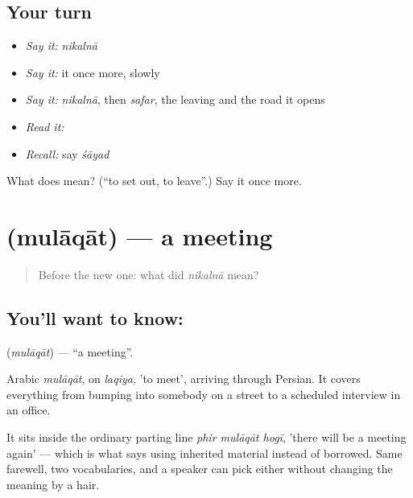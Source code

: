 \subsection*{Your turn}
\begin{itemize}
\raggedright
  \item \emph{Say it:} \emph{nikalnā}
  \item \emph{Say it:} it once more, slowly
  \item \emph{Say it:} \emph{nikalnā}, then \emph{safar}, the leaving and the road it opens
  \item \emph{Read it:} \textbf{}
  \item \emph{Recall:} say \emph{śāyad}
\end{itemize}

\begin{tcolorbox}[breakable,colback=teal!4,colframe=teal!35!black,title={Before you move on}]
What does  mean? (\textquotedblleft{}to set out, to leave\textquotedblright{}.) Say it once more.
\end{tcolorbox}
\section[\texorpdfstring{\hi{मुलाक़ात} (mulāqāt)}{मुलाक़ात (mulāqāt)}]{ (mulāqāt) — a meeting}

\label{lesson:HI-C49-meeting}



\begin{quote}
Before the new one: what did \emph{nikalnā} mean?
\end{quote}

\subsection*{You'll want to know: }
\textbf{} (\emph{mulāqāt}) — \textquotedblleft{}a meeting\textquotedblright{}.

Arabic \emph{mulāqāt}, on \emph{laqiya}, 'to meet', arriving through Persian. It covers everything from bumping into somebody on a street to a scheduled interview in an office.

It sits inside the ordinary parting line \emph{phir mulāqāt hogī}, 'there will be a meeting again' — which is what   says using inherited material instead of borrowed. Same farewell, two vocabularies, and a speaker can pick either without changing the meaning by a hair.

